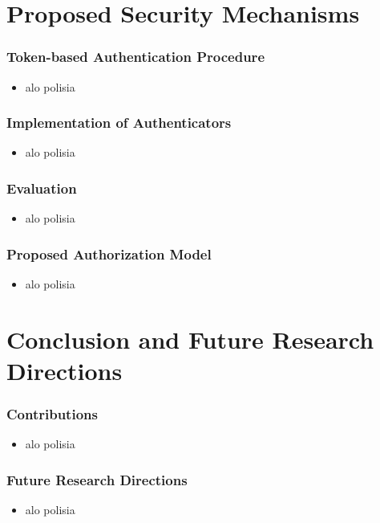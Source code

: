 \documentclass{beamer}
\begin{document}
\section{Proposed Security Mechanisms}
\begin{frame}
\frametitle{Token-based Authentication Procedure}
\begin{itemize}
  \setlength\itemsep{1.5em}
\item alo polisia
\end{itemize}
\end{frame}
\begin{frame}
\frametitle{Implementation of Authenticators}
\begin{itemize}
  \setlength\itemsep{1.5em}
\item alo polisia
\end{itemize}
\end{frame}
\begin{frame}
\frametitle{Evaluation}
\begin{itemize}
  \setlength\itemsep{1.5em}
\item alo polisia
\end{itemize}
\end{frame}
\begin{frame}
\frametitle{Proposed Authorization Model}
\begin{itemize}
  \setlength\itemsep{1.5em}
\item alo polisia
\end{itemize}
\end{frame}
\section{Conclusion and Future Research Directions}
\begin{frame}
\frametitle{Contributions}
\begin{itemize}
  \setlength\itemsep{1.5em}
\item alo polisia
\end{itemize}
\end{frame}
\begin{frame}
\frametitle{Future Research Directions}
\begin{itemize}
  \setlength\itemsep{1.5em}
\item alo polisia
\end{itemize}
\end{frame}
\end{document}
